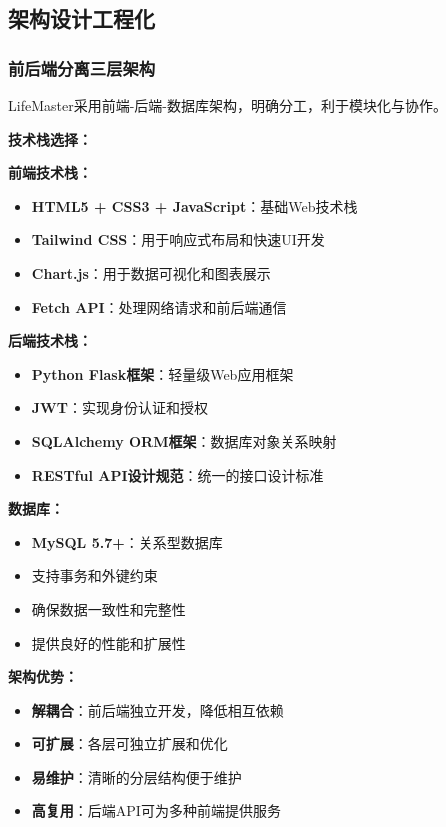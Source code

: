 \documentclass[a4paper]{article}
\begin{document}
\subsection{架构设计工程化}

\subsubsection{前后端分离三层架构}

LifeMaster采用前端-后端-数据库架构，明确分工，利于模块化与协作。

\textbf{技术栈选择：}

\textbf{前端技术栈：}
\begin{itemize}
    \item \textbf{HTML5 + CSS3 + JavaScript}：基础Web技术栈
    \item \textbf{Tailwind CSS}：用于响应式布局和快速UI开发
    \item \textbf{Chart.js}：用于数据可视化和图表展示
    \item \textbf{Fetch API}：处理网络请求和前后端通信
\end{itemize}

\textbf{后端技术栈：}
\begin{itemize}
    \item \textbf{Python Flask框架}：轻量级Web应用框架
    \item \textbf{JWT}：实现身份认证和授权
    \item \textbf{SQLAlchemy ORM框架}：数据库对象关系映射
    \item \textbf{RESTful API设计规范}：统一的接口设计标准
\end{itemize}

\textbf{数据库：}
\begin{itemize}
    \item \textbf{MySQL 5.7+}：关系型数据库
    \item 支持事务和外键约束
    \item 确保数据一致性和完整性
    \item 提供良好的性能和扩展性
\end{itemize}

\textbf{架构优势：}
\begin{itemize}
    \item \textbf{解耦合}：前后端独立开发，降低相互依赖
    \item \textbf{可扩展}：各层可独立扩展和优化
    \item \textbf{易维护}：清晰的分层结构便于维护
    \item \textbf{高复用}：后端API可为多种前端提供服务
\end{itemize}
\end{document}
